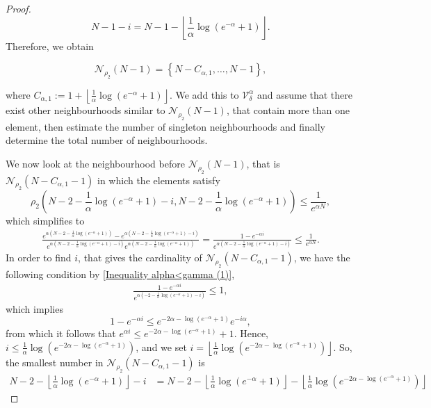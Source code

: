 \documentclass[10pt,a4paper]{amsart}
\begin{document}
\begin{proof}
$$N-1-i= N-1-\left\lfloor\frac{1}{\alpha}\log\left(e^{-\alpha}+1\right)\right\rfloor.$$
Therefore, we obtain

$$\mathcal{N}_{\rho_2}(N-1)=\left\{N-C_{\alpha,1},\ldots,N-1\right\},$$

where $C_{\alpha,1}:=1+\left\lfloor\frac{1}{\alpha}\log\left(e^{-\alpha}+1\right)\right\rfloor$. We add this to $\mathcal{V}_\delta^{\alpha}$ and assume that there exist other neighbourhoods similar to $\mathcal{N}_{\rho_2}(N-1)$, that contain more than one element, then estimate the number of singleton neighbourhoods and finally determine the total number of neighbourhoods. 

We now look at the neighbourhood before $\mathcal{N}_{\rho_2}(N-1)$, that is $\mathcal{N}_{\rho_2}\left(N-C_{\alpha,1}-1\right)$ in which the elements satisfy
$${\rho_2}\left( N-2-\frac{1}{\alpha}\log\left(e^{-\alpha}+1\right)-i, N-2-\frac{1}{\alpha}\log\left(e^{-\alpha}+1\right)\right)\le\frac{1}{e^{\alpha N}},$$
which simplifies to
\begin{align}\label{Inequality alpha<gamma (1)}
    \frac{e^{\alpha\left(N-2-\frac{1}{\alpha}\log\left(e^{-\alpha}+1\right)\right)}-e^{\alpha\left(N-2-\frac{1}{\alpha}\log\left(e^{-\alpha}+1\right)-i\right)}}{e^{\alpha\left(N-2-\frac{1}{\alpha}\log\left(e^{-\alpha}+1\right)-i\right)}e^{\alpha\left(N-2-\frac{1}{\alpha}\log\left(e^{-\alpha}+1\right)\right)}}=\frac{1-e^{-\alpha i}}{e^{\alpha\left(N-2-\frac{1}{\alpha}\log\left(e^{-\alpha}+1\right)-i\right)}}\le \frac{1}{e^{\alpha N}}.
\end{align}
In order to find $i$, that gives the cardinality of $\mathcal{N}_{\rho_2}\left(N-C_{\alpha,1}-1\right)$, we have the following condition by \eqref{Inequality alpha<gamma (1)},
\begin{align*}
    \frac{1-e^{-\alpha i}}{e^{\alpha(-2-\frac{1}{\alpha}\log\left(e^{-\alpha}+1\right)-i)}}\le 1,
\end{align*}
which implies $$1-e^{-\alpha i}\le e^{-2\alpha-\log\left(e^{-\alpha}+1\right)}e^{-i\alpha},$$ from which it follows that $e^{\alpha i}\le e^{-2\alpha-\log\left(e^{-\alpha}+1\right)}+1 $. Hence,
$i\le \frac{1}{\alpha}\log \left(e^{-2\alpha-\log\left(e^{-\alpha}+1\right)}\right)$, and we set $i=\left\lfloor \frac{1}{\alpha}\log \left(e^{-2\alpha-\log\left(e^{-\alpha}+1\right)}\right)\right\rfloor$. So, the smallest number in $\mathcal{N}_{\rho_2}\left(N-C_{\alpha,1}-1\right)$ is 
\begin{align*}
 N-2-\left\lfloor\frac{1}{\alpha}\log\left(e^{-\alpha}+1\right)\right\rfloor-i&=  N-2-\left\lfloor\frac{1}{\alpha}\log\left(e^{-\alpha}+1\right)\right\rfloor- \left\lfloor\frac{1}{\alpha}\log \left(e^{-2\alpha-\log\left(e^{-\alpha}+1\right)}\right)\right\rfloor

\end{align*}
\end{proof}
\end{document}
